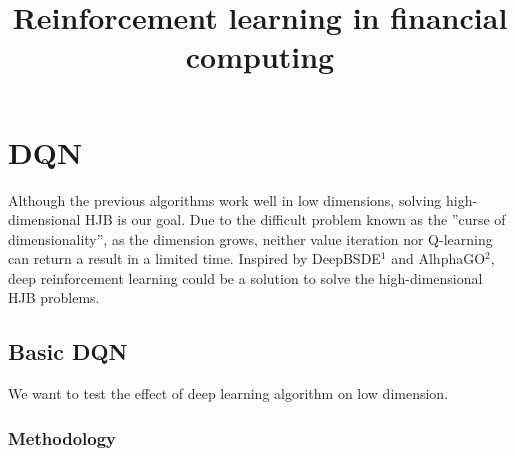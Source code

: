 \documentclass[11pt]{amsart}
\title{ Reinforcement learning in financial computing}
\begin{document}
\maketitle

\section{DQN}
Although the previous algorithms work well in low dimensions, solving high-dimensional HJB is our goal. Due to the difficult problem known as the ''curse of dimensionality'', as the dimension grows, neither value iteration nor Q-learning can return a result in a limited time. Inspired by DeepBSDE$^{1}$ and AlhphaGO$^{2}$, deep reinforcement learning could be a solution to solve the high-dimensional HJB problems.
\subsection{Basic DQN}
We want to test the effect of deep learning algorithm on low dimension.
\subsubsection{Methodology}
\end{document}
